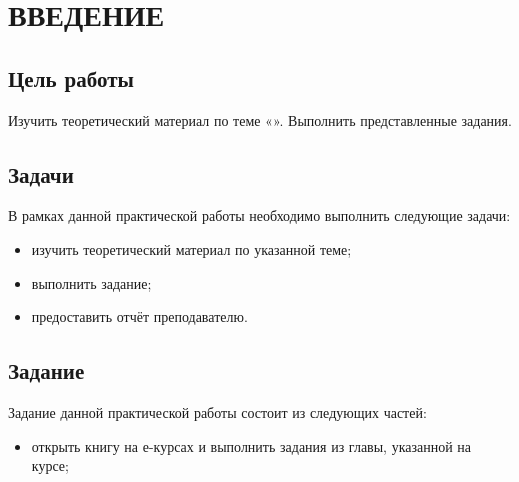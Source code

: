 \setcounter{page}{2} %

\chapter{ВВЕДЕНИЕ}

\vspace{14pt}

\section{Цель работы}

Изучить теоретический материал по теме «\workName». Выполнить представленные задания.

\section{Задачи}

В рамках данной практической работы необходимо выполнить следующие задачи:

\begin{itemize}[label=-, leftmargin=1.65cm]
    \item изучить теоретический материал по указанной теме;
    \item выполнить задание;
    \item предоставить отчёт преподавателю.
\end{itemize}

\section{Задание}

Задание данной практической работы состоит из следующих частей:

\begin{itemize}[label=-, leftmargin=1.65cm]
    \item открыть книгу на е-курсах и выполнить задания из главы, указанной на курсе;
\end{itemize}